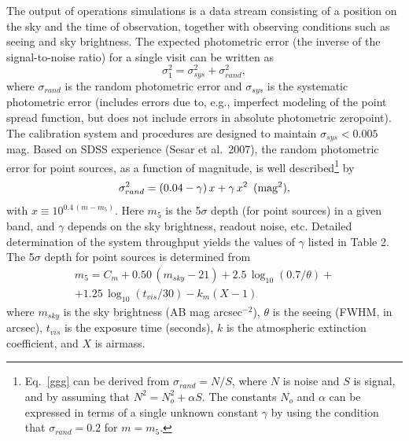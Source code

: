 \documentclass{emulateapj}
\begin{document}
The output of operations simulations is a data stream consisting of 
a position on the sky and the time of observation, together with 
observing conditions such as seeing and sky brightness. The expected 
photometric error (the inverse of the signal-to-noise ratio) for a single visit
can be written as
\begin{equation}
         \sigma_1^2 = \sigma_{sys}^2 + \sigma_{rand}^2,
\end{equation}
where $\sigma_{rand}$ is the random photometric error and $\sigma_{sys}$ is 
the systematic photometric error (includes errors due to, e.g., imperfect
modeling of the point spread function, but does not include errors in 
absolute photometric zeropoint). The calibration system and procedures
are designed to maintain $\sigma_{sys}<0.005$ mag. Based on 
SDSS experience (Sesar et al.~2007), the random photometric error for
point sources, as
a function of magnitude, is well described\footnote{Eq.~\ref{ggg} can 
be derived from $\sigma_{rand}=N/S$, where $N$ is noise and $S$ is signal, 
and by assuming that $N^2 = N_o^2 + \alpha S$. The constants $N_o$ and 
$\alpha$ can be expressed in terms of a single unknown constant $\gamma$ 
by using the condition that $\sigma_{rand}=0.2$ for $m=m_5$.} by
\begin{equation}
\label{ggg}
  \sigma_{rand}^2 = (0.04-\gamma)\, x + \gamma \, x^2 \,\,\, {\rm (mag^2),}
\end{equation}
with $x \equiv 10^{0.4\,(m-m_5)}$. Here $m_5$ is the 5$\sigma$ depth (for
point sources) in a given band, and $\gamma$ depends on the sky 
brightness, readout noise, etc. 
Detailed determination of the system throughput yields the values of $\gamma$ 
listed in Table 2. The 5$\sigma$ depth for point sources is determined from 
\begin{eqnarray}
\label{m5}
  m_5 = C_m + 0.50\,(m_{sky}-21) + 2.5\,\log_{10}(0.7/\theta) +  \nonumber \\
        + 1.25\,\log_{10}(t_{vis}/30) - k_m(X-1) \phantom{xxxxx}
\end{eqnarray}
where $m_{sky}$ is the sky brightness (AB mag arcsec$^{-2}$), $\theta$ is 
the seeing (FWHM, in arcsec), $t_{vis}$ is the exposure time (seconds),
$k$ is the atmospheric extinction coefficient, and $X$ is airmass. 
\end{document}
